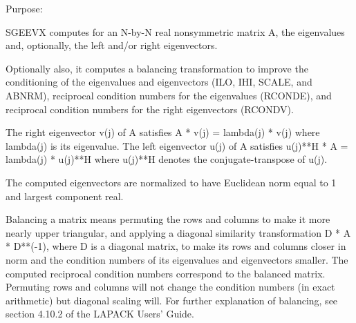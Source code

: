  \begin{DoxyParagraph}{Purpose\+: }
\begin{DoxyVerb} SGEEVX computes for an N-by-N real nonsymmetric matrix A, the
 eigenvalues and, optionally, the left and/or right eigenvectors.

 Optionally also, it computes a balancing transformation to improve
 the conditioning of the eigenvalues and eigenvectors (ILO, IHI,
 SCALE, and ABNRM), reciprocal condition numbers for the eigenvalues
 (RCONDE), and reciprocal condition numbers for the right
 eigenvectors (RCONDV).

 The right eigenvector v(j) of A satisfies
                  A * v(j) = lambda(j) * v(j)
 where lambda(j) is its eigenvalue.
 The left eigenvector u(j) of A satisfies
               u(j)**H * A = lambda(j) * u(j)**H
 where u(j)**H denotes the conjugate-transpose of u(j).

 The computed eigenvectors are normalized to have Euclidean norm
 equal to 1 and largest component real.

 Balancing a matrix means permuting the rows and columns to make it
 more nearly upper triangular, and applying a diagonal similarity
 transformation D * A * D**(-1), where D is a diagonal matrix, to
 make its rows and columns closer in norm and the condition numbers
 of its eigenvalues and eigenvectors smaller.  The computed
 reciprocal condition numbers correspond to the balanced matrix.
 Permuting rows and columns will not change the condition numbers
 (in exact arithmetic) but diagonal scaling will.  For further
 explanation of balancing, see section 4.10.2 of the LAPACK
 Users' Guide.\end{DoxyVerb}
 
\end{DoxyParagraph}

